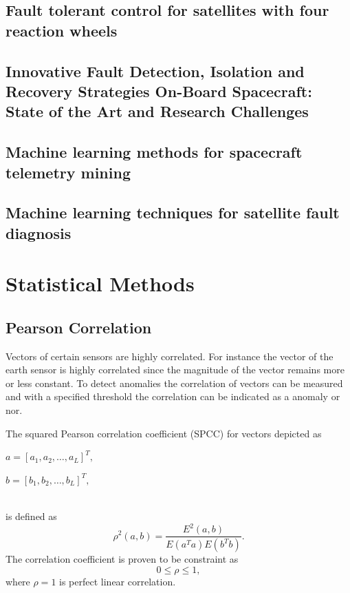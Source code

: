 \subsection{Fault tolerant control for satellites with four reaction wheels}
\cite{jin2008fault}

\subsection{Innovative Fault Detection, Isolation and Recovery Strategies On-Board Spacecraft: State of the Art and Research Challenges}
\cite{wander2013innovative}

\subsection{Machine learning methods for spacecraft telemetry mining}
\cite{ibrahim2018machine}

\subsection{Machine learning techniques for satellite fault diagnosis}
\cite{ibrahim2020machine}

\section{Statistical Methods}
\subsection{Pearson Correlation}
Vectors of certain sensors are highly correlated. For instance the vector of the earth sensor is highly correlated since the magnitude of the vector remains more or less constant. To detect anomalies the correlation of vectors can be measured and with a specified threshold the correlation can be indicated as a anomaly or nor.

The squared Pearson correlation coefficient (SPCC) for vectors depicted as
\linebreak
\\
\centerline{$a = [a_1, a_2, \ldots, a_L]^T,$}
\linebreak
\centerline{$b = [b_1, b_2, \ldots, b_L]^T,$}
\\
is defined as \cite{benesty2009pearson}
\begin{equation}
	\rho^2 (a,b) = \frac{E^2 (a,b)}{E(a^Ta)E(b^Tb)}.
\end{equation}
The correlation coefficient is proven to be constraint as
\begin{equation}
	0 \leq \rho \leq 1,
\end{equation}
where $\rho = 1$ is perfect linear correlation. 

